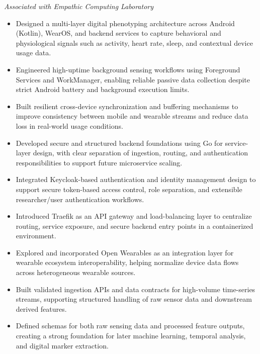 \noindent
{}

\noindent
\textit{Associated with Empathic Computing Laboratory}

\begin{itemize}
    \item Designed a multi-layer digital phenotyping architecture across Android (Kotlin), WearOS, and backend services to capture behavioral and physiological signals such as activity, heart rate, sleep, and contextual device usage data.

    \item Engineered high-uptime background sensing workflows using Foreground Services and WorkManager, enabling reliable passive data collection despite strict Android battery and background execution limits.

    \item Built resilient cross-device synchronization and buffering mechanisms to improve consistency between mobile and wearable streams and reduce data loss in real-world usage conditions.

    \item Developed secure and structured backend foundations using Go for service-layer design, with clear separation of ingestion, routing, and authentication responsibilities to support future microservice scaling.

    \item Integrated Keycloak-based authentication and identity management design to support secure token-based access control, role separation, and extensible researcher/user authentication workflows.

    \item Introduced Traefik as an API gateway and load-balancing layer to centralize routing, service exposure, and secure backend entry points in a containerized environment.

    \item Explored and incorporated Open Wearables as an integration layer for wearable ecosystem interoperability, helping normalize device data flows across heterogeneous wearable sources.

    \item Built validated ingestion APIs and data contracts for high-volume time-series streams, supporting structured handling of raw sensor data and downstream derived features.

    \item Defined schemas for both raw sensing data and processed feature outputs, creating a strong foundation for later machine learning, temporal analysis, and digital marker extraction.


\end{itemize}
